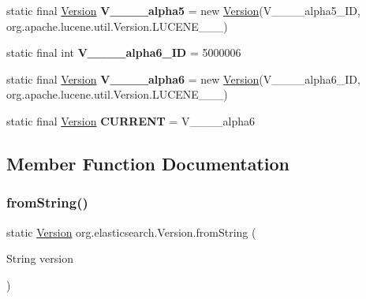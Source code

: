 \begin{DoxyCompactItemize}
\hypertarget{classorg_1_1elasticsearch_1_1_version_afaa33a100c4ff4b81e852de6640456ef}{}\label{classorg_1_1elasticsearch_1_1_version_afaa33a100c4ff4b81e852de6640456ef} 
static final \hyperlink{classorg_1_1elasticsearch_1_1_version}{Version} {\bfseries V\+\_\+\_\+\_\+\_\+alpha5} = new \hyperlink{classorg_1_1elasticsearch_1_1_version}{Version}(V\+\_\+\_\+\_\+\_\+alpha5\+\_\+\+ID, org.\+apache.\+lucene.\+util.\+Version.\+L\+U\+C\+E\+N\+E\+\_\+\_\+\_)
\item 
\hypertarget{classorg_1_1elasticsearch_1_1_version_a108b40df6c9e510239023f6f63001bf6}{}\label{classorg_1_1elasticsearch_1_1_version_a108b40df6c9e510239023f6f63001bf6} 
static final int {\bfseries V\+\_\+\_\+\_\+\_\+alpha6\+\_\+\+ID} = 5000006
\item 
\hypertarget{classorg_1_1elasticsearch_1_1_version_ada51d61b7053a8ec51ecfea17d733745}{}\label{classorg_1_1elasticsearch_1_1_version_ada51d61b7053a8ec51ecfea17d733745} 
static final \hyperlink{classorg_1_1elasticsearch_1_1_version}{Version} {\bfseries V\+\_\+\_\+\_\+\_\+alpha6} = new \hyperlink{classorg_1_1elasticsearch_1_1_version}{Version}(V\+\_\+\_\+\_\+\_\+alpha6\+\_\+\+ID, org.\+apache.\+lucene.\+util.\+Version.\+L\+U\+C\+E\+N\+E\+\_\+\_\+\_)
\item 
\hypertarget{classorg_1_1elasticsearch_1_1_version_adf1d54329f831a105ddcb53726c0592a}{}\label{classorg_1_1elasticsearch_1_1_version_adf1d54329f831a105ddcb53726c0592a} 
static final \hyperlink{classorg_1_1elasticsearch_1_1_version}{Version} {\bfseries C\+U\+R\+R\+E\+NT} = V\+\_\+\_\+\_\+\_\+alpha6
\end{DoxyCompactItemize}


\subsection{Member Function Documentation}
\hypertarget{classorg_1_1elasticsearch_1_1_version_a86635d26e4db619bfa9f33cee16be1e5}{}\label{classorg_1_1elasticsearch_1_1_version_a86635d26e4db619bfa9f33cee16be1e5} 
\subsubsection{\texorpdfstring{from\+String()}{fromString()}}
{\footnotesize\ttfamily static \hyperlink{classorg_1_1elasticsearch_1_1_version}{Version} org.\+elasticsearch.\+Version.\+from\+String (\begin{DoxyParamCaption}\item[{String}]{version }\end{DoxyParamCaption})\hspace{0.3cm}{\ttfamily [static]}}

